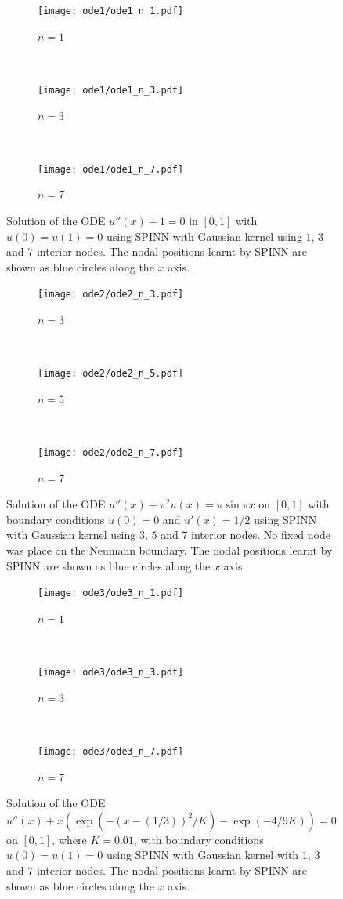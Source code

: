 \documentclass[12pt]{article}
\begin{document}
\begin{figure}
\centering
\begin{subfigure}{0.3\textwidth}
\texttt{[image: ode1/ode1\_n\_1.pdf]}
\caption{$n = 1$}
\label{fig:ode1_n_1}
\end{subfigure}
~
\begin{subfigure}{0.3\textwidth}
\texttt{[image: ode1/ode1\_n\_3.pdf]}
\caption{$n = 3$}
\label{fig:ode1_n_3}
\end{subfigure}
~
\begin{subfigure}{0.3\textwidth}
\texttt{[image: ode1/ode1\_n\_7.pdf]}
\caption{$n = 7$}
\label{fig:ode1_n_7}
\end{subfigure}
\caption{Solution of the ODE $u''(x) + 1 = 0$ in $[0,1]$ with $u(0) = u(1) = 0$ using SPINN with Gaussian kernel using $1$, $3$ and $7$ interior nodes. The nodal positions learnt by SPINN are shown as blue circles along the $x$ axis.}
\label{fig:spinn_ode_1}
\end{figure}

\begin{figure}
\centering
\begin{subfigure}{0.3\textwidth}
\texttt{[image: ode2/ode2\_n\_3.pdf]}
\caption{$n = 3$}
\label{fig:ode2_n_3}
\end{subfigure}
~
\begin{subfigure}{0.3\textwidth}
\texttt{[image: ode2/ode2\_n\_5.pdf]}
\caption{$n = 5$}
\label{fig:ode2_n_5}
\end{subfigure}
~
\begin{subfigure}{0.3\textwidth}
\texttt{[image: ode2/ode2\_n\_7.pdf]}
\caption{$n = 7$}
\label{fig:ode2_n_7}
\end{subfigure}
\caption{Solution of the ODE $u''(x) + \pi^2 u(x) = \pi \sin \pi x$ on $[0,1]$ with boundary conditions $u(0) = 0$ and $u'(x) = 1/2$ using SPINN with Gaussian kernel using $3$, $5$ and $7$ interior nodes. No fixed node was place on the Neumann boundary. The nodal positions learnt by SPINN are shown as blue circles along the $x$ axis.}
\label{fig:spinn_ode_2}
\end{figure}

\begin{figure}
\centering
\begin{subfigure}{0.3\textwidth}
\texttt{[image: ode3/ode3\_n\_1.pdf]}
\caption{$n = 1$}
\label{fig:ode3_n_1}
\end{subfigure}
~
\begin{subfigure}{0.3\textwidth}
\texttt{[image: ode3/ode3\_n\_3.pdf]}
\caption{$n = 3$}
\label{fig:ode3_n_3}
\end{subfigure}
~
\begin{subfigure}{0.3\textwidth}
\texttt{[image: ode3/ode3\_n\_7.pdf]}
\caption{$n = 7$}
\label{fig:ode3_n_7}
\end{subfigure}
\caption{Solution of the ODE $u''(x) + x(\exp (-(x - (1/3))^2/K) - \exp (-4/9K)) = 0$ on $[0,1]$, where $K = 0.01$, with boundary conditions $u(0) = u(1) = 0$ using SPINN with Gaussian kernel with $1$, $3$ and $7$ interior nodes. The nodal positions learnt by SPINN are shown as blue circles along the $x$ axis.}
\label{fig:spinn_ode_3}
\end{figure}
\end{document}
